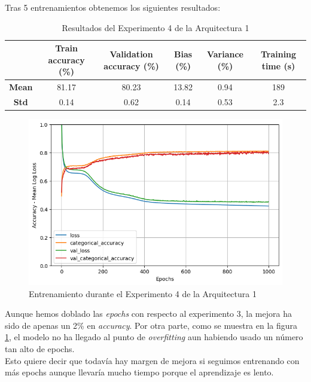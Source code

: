 \documentclass{article}
\begin{document}
			Tras 5 entrenamientos obtenemos los siguientes resultados:
			\begin{table}[!h]
				\begin{center}
					\begin{tabular}{ c | c | c | c | c | c |}
						\ & \textbf{Train accuracy (\%)} & \textbf{Validation accuracy (\%)} & \textbf{Bias (\%)} & \textbf{Variance (\%)} & \textbf{Training time (s)} \\ \hline
						\textbf{Mean} & 81.17 & 80.23 & 13.82 & 0.94 & 189\\ \hline
						\textbf{Std} & 0.14 & 0.62 & 0.14 & 0.53 & 2.3 \\ \hline
					\end{tabular}
					\caption{Resultados del Experimento 4 de la Arquitectura 1}
					\label{tab:res-a1-e4}
				\end{center}
			\end{table}
			
			\begin{figure}[!h]
				\begin{center}
					\includegraphics[scale=0.5]{tr-a1-e4.png}		
					\caption{Entrenamiento durante el Experimento 4 de la Arquitectura 1}	
					\label{tr-a1-e4}
				\end{center}
			\end{figure}
			
			Aunque hemos doblado las \textit{epochs} con respecto al experimento 3, la mejora ha sido de apenas un 2\% en \textit{accuracy}. Por otra parte, como se muestra en la figura \ref{tr-a1-e4}, el modelo no ha llegado al punto de \textit{overfitting} aun habiendo usado un n\'umero tan alto de epochs.\\
			Esto quiere decir que todav\'ia hay margen de mejora si seguimos entrenando con m\'as epochs aunque llevar\'ia mucho tiempo porque el aprendizaje es lento.\\
			
\end{document}
